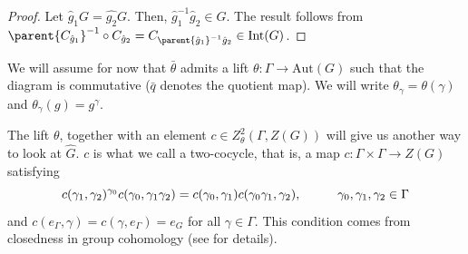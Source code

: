 \begin{proof}
    Let \(\hat{g}_1G=\hat{g_2} G\). Then, \(\hat{g}_1^{-1} \hat{g}_2 \in G\). The result follows from \(\parent{C_{\hat{g}_1}}^{-1}\circ C_{\hat{g}_2}=C_{\parent{\hat{g}_1}^{-1} \hat{g}_2}\in \mathrm{Int}(G)\).
\end{proof}
\noindent
\begin{minipage}{0.75\textwidth}
   We will assume for now that \(\bar{\theta}\) admits a lift \(\theta\colon \Gamma \to \mathrm{Aut}(G)\) such that the diagram is commutative (\(\bar{q}\) denotes the quotient map). We will write \(\theta_\gamma=\theta(\gamma)\) and \(\theta_\gamma(g)=g^\gamma\).
\end{minipage}
\begin{minipage}{0.24\textwidth}
    \begin{center}
\end{center}
\end{minipage}
The lift \(\theta\), together with an element \(c \in Z^2_\theta(\Gamma, Z(G))\) will give us another way to look at \(\hat{G}\). \(c\) is what we call a two-cocycle, that is, a map \(c\colon \Gamma \times \Gamma \to Z(G)\) satisfying
\begin{equation} \label{def_cocycle_cond}
c(\gamma_1, \gamma_2)^{\gamma_0}c(\gamma_0, \gamma_1 \gamma_2)=c(\gamma_0, \gamma_1)c(\gamma_0\gamma_1, \gamma_2), \hspace{1 cm} \gamma_0, \gamma_1, \gamma_2 \in \Gamma
\end{equation}
and \(c(e_\Gamma, \gamma)=c(\gamma, e_\Gamma)=e_G\) for all \(\gamma \in \Gamma\). This condition comes from closedness in group cohomology (see \parencite[Appendix 18.3]{hilgert2011structure} for details). 

